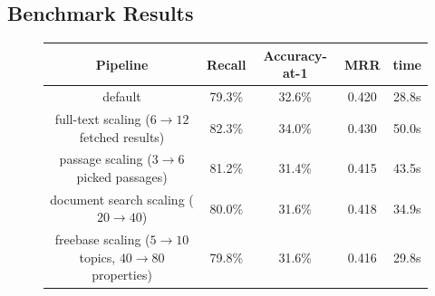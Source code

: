 \subsection{Benchmark Results}

\begin{figure}[t]
\renewcommand{\arraystretch}{1.3}
\centering
\begin{tabular}{|c|cccc|}
\hline
Pipeline & Recall & Accuracy-at-1 & MRR & time \\ \hline \hline
default & 79.3\% & 32.6\% & 0.420 & 28.8s \\
\hline
full-text scaling ($6\to12$ fetched results) & 82.3\% & 34.0\% & 0.430 & 50.0s \\

passage scaling ($3\to6$ picked passages) & 81.2\% & 31.4\% & 0.415 & 43.5s \\

document search scaling ($20\to40$) & 80.0\% & 31.6\% & 0.418 & 34.9s \\

freebase scaling ($5\to10$ topics, $40\to80$ properties) & 79.8\% & 31.6\% & 0.416 & 29.8s \\


\end{tabular}
\end{figure}
